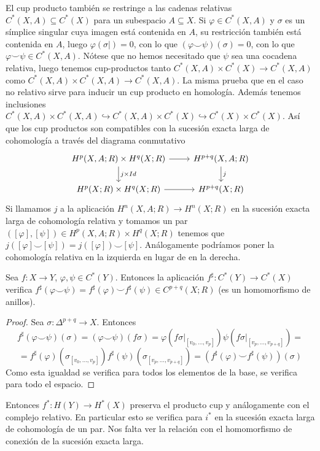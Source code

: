 \documentclass[TA.tex]{subfiles}
\begin{document}
El cup producto también se restringe a las cadenas relativas $C^*(X,A)\subseteq C^*(X)$ para un subespacio $A\subseteq X$. Si $\varphi\in C^*(X,A)$ y $\sigma$ es un símplice singular cuya imagen está contenida en $A$, su restricción también está contenida en $A$, luego $\varphi(\sigma|)=0$, con lo que $(\varphi\smile\psi)(\sigma)=0$, con lo que $\varphi\smile\psi\in C^*(X,A)$. Nótese que no hemos necesitado que $\psi$ sea una cocadena relativa, luego tenemos cup-productos tanto $C^*(X,A)\times C^*(X)\to C^*(X,A)$ como $C^*(X,A)\times C^*(X,A)\to C^*(X,A)$. La misma prueba que en el caso no relativo sirve para inducir un cup producto en homología. Además tenemos inclusiones $C^*(X,A)\times C^*(X,A)\hookrightarrow C^*(X,A)\times C^*(X)\hookrightarrow C^*(X)\times C^*(X)$.  Así que los cup productos son compatibles con la sucesión exacta larga de cohomología a través del diagrama conmutativo
\[
\begin{tikzcd}
H^p(X,A;R)\times H^q(X;R)\arrow[r]\arrow[d, "j\times Id"] & H^{p+q}(X,A;R)\arrow[d, "j"]\\
H^p(X;R)\times H^q(X;R)\arrow[r] & H^{p+q}(X;R)
\end{tikzcd}
\]
Si llamamos $j$ a la aplicación $H^n(X,A;R)\to H^n(X;R)$ en la sucesión exacta larga de cohomología relativa y tomamos un par $([\varphi],[\psi])\in H^p(X,A;R)\times H^q(X;R)$ tenemos que $j([\varphi]\smile [\psi])=j([\varphi])\smile[\psi]$. Análogamente podríamos poner la cohomología relativa en la izquierda en lugar de en la derecha. 

\begin{lemma}
Sea $f:X\to Y$, $\varphi,\psi\in C^*(Y)$. Entonces la aplicación $f^\sharp:C^*(Y)\to C^*(X)$ verifica $f^\sharp(\varphi\smile\psi)=f^\sharp(\varphi)\smile f^\sharp(\psi)\in C^{p+q}(X;R)$ (es un homomorfismo de anillos).
\end{lemma}
\begin{proof}
Sea $\sigma:\Delta^{p+q}\to X$. Entonces
\[
f^\sharp(\varphi\smile\psi)(\sigma)=(\varphi\smile\psi)(f\sigma)=\varphi(f\sigma|_{[v_0,\dots, v_p]})\psi(f\sigma|_{[v_p,\dots, v_{p+q}]})=\]
\[
=f^\sharp(\varphi)(\sigma_{[v_0,\dots, v_p]}) f^\sharp(\psi)(\sigma_{[v_p,\dots, v_{p+q}]})=(f^\sharp(\varphi)\smile f^\sharp(\psi))(\sigma)
\]
Como esta igualdad se verifica para todos los elementos de la base, se verifica para todo el espacio. 
\end{proof}
Entonces $f^*:H(Y)\to H^*(X)$ preserva el producto cup y análogamente con el complejo relativo. En particular esto se verifica para $i^*$ en la sucesión exacta larga de cohomología de un par. Nos falta ver la relación con el homomorfismo de conexión de la sucesión exacta larga. 
\end{document}
